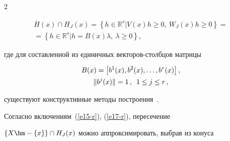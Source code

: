 \begin{multicols}{2}
\noindent


  \begin{multline}


 \! \!\!\overline{H}(x)\cap H_J(x)\!=\!\left\{ h\in \mathbb{R}^s\vert V(x)h\geq 0,\ 


W_J(x)h\geq 0\right\}\!={}\\


  {}= \left\{ h\in \mathbb{R}^s\vert h=B(x)\lambda,\ \lambda\geq0\right\},


  \label{e18-r}


  \end{multline}


  


  \vspace*{-4pt}





\noindent


где для составленной из единичных век\-то\-ров-столб\-цов матрицы 





\vspace*{-6pt}





\noindent


\begin{multline}


B(x)=\left[ b^1(x),b^2(x),\ldots , b^r(x)\right],\\


\| b^j(x)\|=1\,,\enskip 1\leq j\leq r\,,


\label{e19-r}


\end{multline}





\vspace*{-4pt}





\noindent


существуют конструктивные методы по\-стро\-ения~\cite{3-r}.





  Согласно включениям~(\ref{e15-r}), (\ref{e17-r}), пересечение 


  $\{X \hm- \{x\}\}\cap H_J(x)$ можно аппроксимировать, выбрав из конуса 



\end{multicols}
